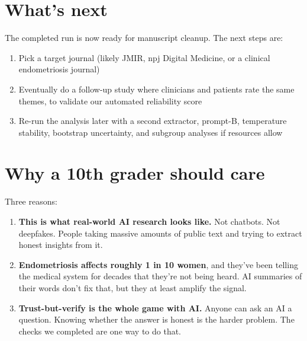 \documentclass[11pt]{article}
\begin{document}
\section{What's next}

The completed run is now ready for manuscript cleanup. The next steps are:

\begin{enumerate}
  \item Pick a target journal (likely JMIR, npj Digital Medicine, or
    a clinical endometriosis journal)
  \item Eventually do a follow-up study where clinicians and patients
    rate the same themes, to validate our automated reliability score
  \item Re-run the analysis later with a second extractor, prompt-B,
    temperature stability, bootstrap uncertainty, and subgroup analyses
    if resources allow
\end{enumerate}

\section{Why a 10th grader should care}

Three reasons:

\begin{enumerate}
  \item \textbf{This is what real-world AI research looks like.} Not
    chatbots. Not deepfakes. People taking massive amounts of public
    text and trying to extract honest insights from it.
  \item \textbf{Endometriosis affects roughly 1 in 10 women}, and
    they've been telling the medical system for decades that they're
    not being heard. AI summaries of their words don't fix that, but
    they at least amplify the signal.
  \item \textbf{Trust-but-verify is the whole game with AI.} Anyone
    can ask an AI a question. Knowing whether the answer is honest is
    the harder problem. The checks we completed are one way to do that.
\end{enumerate}



\end{document}
